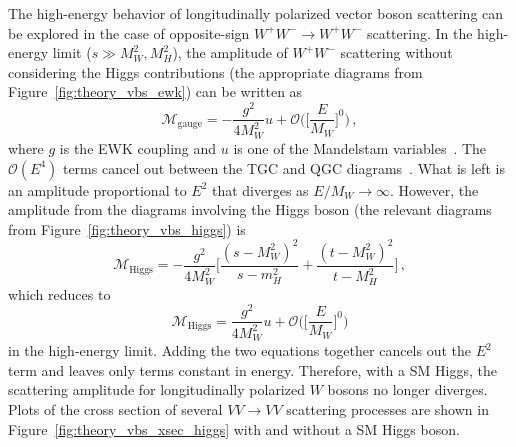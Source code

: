 The high-energy behavior of longitudinally polarized vector boson scattering can be explored in the case of opposite-sign $W^{+}W^{-}\rightarrow W^{+}W^{-}$ scattering.
In the high-energy limit ($s \gg M_W^2, M_H^2$), the amplitude of $W^{+}W^{-}$ scattering without considering the Higgs contributions (the appropriate diagrams from Figure~\ref{fig:theory_vbs_ewk}) can be written as
\begin{equation}
  \mathcal{M}_{\textrm{gauge}} = -\frac{g^2}{4M_W^2}u+\mathcal{O}\Bigg(\bigg[\frac{E}{M_W}\bigg]^0\Bigg)\,,
  \label{eq:theory_longitudinal_m_gauge}
\end{equation}
where $g$ is the EWK coupling and $u$ is one of the Mandelstam variables~\cite{2009.strong-gauge-boson-scattering}.
The $\mathcal{O}(E^4)$ terms cancel out between the TGC and QGC diagrams~\cite{2012.vbs-thesis-oord}.
What is left is an amplitude proportional to $E^2$ that diverges as $E/M_W\rightarrow\infty$.
However, the amplitude from the diagrams involving the Higgs boson (the relevant diagrams from Figure~\ref{fig:theory_vbs_higgs}) is
\begin{equation}
  \mathcal{M}_{\textrm{Higgs}} = -\frac{g^2}{4M_W^2}\bigg[\frac{(s-M_W^2)^2}{s-m_H^2}+\frac{(t-M_W^2)^2}{t-M_H^2}\bigg]\,,
\end{equation}
which reduces to
\begin{equation}
  \mathcal{M}_{\textrm{Higgs}} = \frac{g^2}{4M_W^2}u+\mathcal{O}\Bigg(\bigg[\frac{E}{M_W}\bigg]^0\Bigg)
  \label{eq:theory_longitudinal_m_higgs}
\end{equation}
in the high-energy limit.
Adding the two equations together cancels out the $E^2$ term and leaves only terms constant in energy.
Therefore, with a SM Higgs, the scattering amplitude for longitudinally polarized $W$ bosons no longer diverges.
Plots of the cross section of several $VV\rightarrow VV$ scattering processes are shown in Figure~\ref{fig:theory_vbs_xsec_higgs} with and without a SM Higgs boson.

